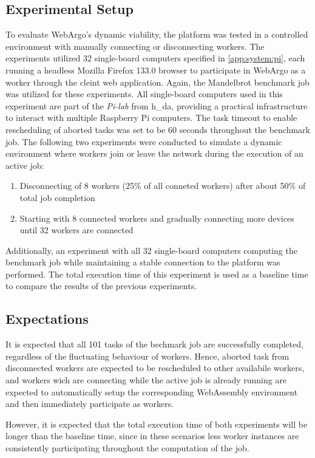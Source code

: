 \subsection{Experimental Setup}
To evaluate WebArgo's dynamic viability, the platform was tested in a controlled environment with manually connecting or disconnecting workers. The experiments utilized 32 single-board computers specified in \autoref{app:system:pi}, each running a headless Mozilla Firefox 133.0 \cite{background:firefox2} browser to participate in WebArgo as a worker through the cleint web application. Again, the Mandelbrot benchmark job was utilized for these experiments. All single-board computers used in this experiment are part of the \emph{Pi-lab} from h\_da, providing a practical infrastructure to interact with multiple Raspberry Pi computers. The task timeout to enable rescheduling of aborted tasks was set to be 60 seconds throughout the benchmark job. The following two experiments were conducted to simulate a dynamic environment where workers join or leave the network during the execution of an active job:
\begin{enumerate}
    \item Disconnecting of 8 workers (25\% of all conneted workers) after about 50\% of total job completion 
    \item Starting with 8 connected workers and gradually connecting more devices until 32 workers are connected
\end{enumerate}
Additionally, an experiment with all 32 single-board computers computing the benchmark job while maintaining a stable connection to the platform was performed. The total execution time of this experiment is used as a baseline time to compare the results of the previous experiments.

\subsection{Expectations}
It is expected that all 101 tasks of the bechmark job are successfully completed, regardless of the fluctuating behaviour of workers. Hence, aborted task from disconnected workers are expected to be rescheduled to other availabile workers, and workers wich are connecting while the active job is already running are expected to automatically setup the corresponding WebAssembly environment and then immediately participate as workers.

However, it is expected that the total execution time of both experiments will be longer than the baseline time, since in these scenarios less worker instances are consistently participating throughout the computation of the job. 

